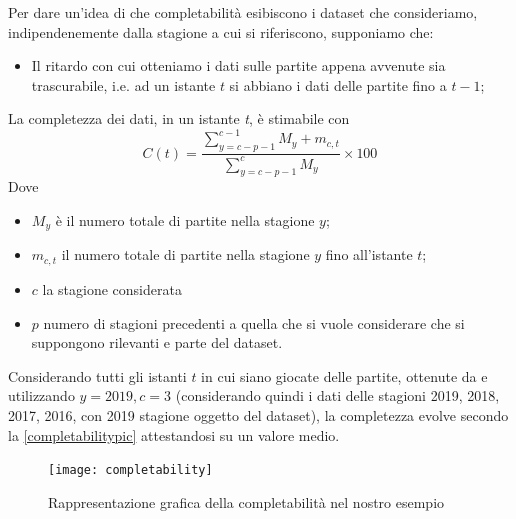 \par

Per dare un'idea di che completabilità esibiscono i dataset che consideriamo, indipendenemente dalla stagione a cui si riferiscono, supponiamo che:


\begin{itemize}
	\item Il ritardo con cui otteniamo i dati sulle partite appena avvenute sia trascurabile, i.e. ad un istante $t$ si abbiano i dati delle partite fino a $t-1$;
\end{itemize}

	La completezza dei dati, in un istante \textit{t}, è stimabile con $$ C(t) = \frac{\sum\limits_{y=c-p-1}^{c-1} M_{y} + m_{c,t}}{\sum\limits_{y=c-p-1}^{c} M_{y}} \times 100 $$
	Dove \begin{itemize}
		\item $M_y$ è il numero totale di partite nella stagione $y$;
		\item $m_{c,t}$ il numero totale di partite nella stagione $y$ fino all'istante $t$;
		\item $c$ la stagione considerata
		\item $p$ numero di stagioni precedenti a quella che si vuole considerare che si suppongono rilevanti e parte del dataset.
	\end{itemize}

Considerando tutti gli istanti $t$ in cui siano giocate delle partite, ottenute da \cite{nba_schedule} e utilizzando $y = 2019, c = 3$ (considerando quindi i dati delle stagioni 2019, 2018, 2017, 2016, con 2019 stagione oggetto del dataset), la completezza evolve secondo la \autoref{completabilitypic} attestandosi su un valore medio.

\begin{figure}
\caption{Rappresentazione grafica della completabilità nel nostro esempio}
\label{completabilitypic}
\texttt{[image: completability]}
\end{figure}